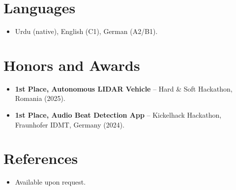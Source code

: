 \documentclass[11pt,a4paper,sans]{moderncv}
\begin{document}

\section{Languages}
\vspace{1pt}
\begin{itemize}
\item Urdu (native), English (C1), German (A2/B1).
\end{itemize}


\section{Honors and Awards}
\vspace{1pt}
\begin{itemize}
\item{\textbf{1st Place, Autonomous LIDAR Vehicle} -- Hard \& Soft Hackathon, Romania (2025).}
\item{\textbf{1st Place, Audio Beat Detection App} -- Kickelhack Hackathon, Fraunhofer IDMT, Germany (2024).}
\end{itemize}


\section{References}
\vspace{1pt}
\begin{itemize}
\item{Available upon request.}
\end{itemize}
\end{document}
